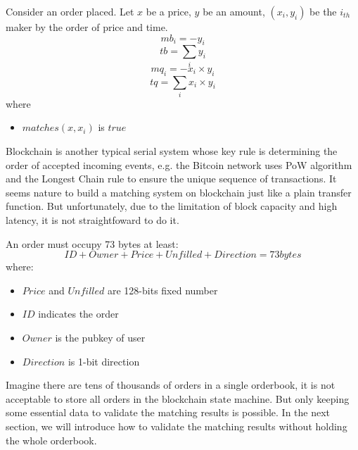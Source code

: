 \documentclass[a4paper,12pt]{article}
\begin{document}
Consider an order placed. Let \(x\) be a price, \(y\) be an amount,  \((x_{i}, y_{i})\) be the \(i_{th}\) maker by the order of price and time.
\begin{equation*}
    mb_{i}=-y_{i}
\end{equation*}
\begin{equation*}
    tb=\sum\limits_{i} y_{i}
\end{equation*}
\begin{equation*}
    mq_{i}=-x_{i} \times y_{i}
\end{equation*}
\begin{equation*}
    tq=\sum\limits_{i} x_{i} \times y_{i}
\end{equation*}
where
\begin{itemize}
    \item $matches(x, x_{i})$ is $true$
\end{itemize}

Blockchain is another typical serial system whose key rule is determining the order of accepted incoming events, e.g. the Bitcoin network uses PoW algorithm and the Longest Chain rule to ensure the unique sequence of transactions. It seems nature to build a matching system on blockchain just like a plain transfer function. But unfortunately, due to the limitation of block capacity and high latency, it is not straightfoward to do it.

An order must occupy 73 bytes at least:
\begin{equation*}
ID + Owner + Price + Unfilled + Direction = 73 bytes
\end{equation*}
where:
\begin{itemize}
    \item $Price$ and $Unfilled$ are 128-bits fixed number
    \item $ID$ indicates the order
    \item $Owner$ is the pubkey of user
    \item $Direction$ is 1-bit direction
\end{itemize}

Imagine there are tens of thousands of orders in a single orderbook, it is not acceptable to store all orders in the blockchain state machine. But only keeping some essential data to validate the matching results is possible. In the next section, we will introduce how to validate the matching results without holding the whole orderbook.
\end{document}
